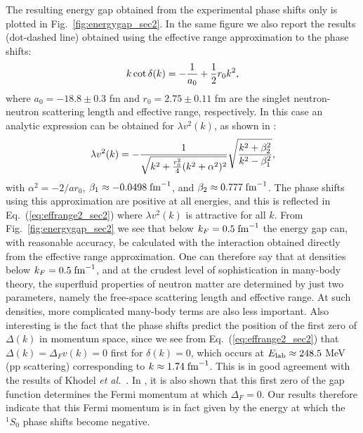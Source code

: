 \documentclass[rmp,aps,floatfix]{revtex4}
\begin{document}
The resulting energy gap obtained from the experimental phase
shifts only is plotted in Fig.~\ref{fig:energygap_sec2}.
In the same figure we also report the results (dot-dashed line) 
obtained using the effective range approximation to the phase shifts: 
\begin{equation}
       k\cot \delta(k)=-{{1}\over{a_0}}+{{1}\over{2}}r_0 k^2, 
\end{equation}
where $a_0=-18.8\pm 0.3$ fm and $r_0=2.75\pm 0.11$ fm are the singlet 
neutron-neutron scattering length and effective range, respectively.  
In this case an analytic expression can be obtained for $\lambda v^2(k)$, as 
shown in \cite{cs92}:
\begin{equation}
  \lambda v^2(k)=-{{1}\over{\sqrt{k^2+{{r_0^2}\over{4}}(k^2+\alpha^2)^2}}}
                \sqrt{{k^2+\beta_2^2}\over{k^2-\beta_1^2}},
   \label{eq:effrange2_sec2}
\end{equation}
with $\alpha^2=-2/ar_0$, $\beta_1\approx-0.0498\;{\rm fm}^{-1}$, 
and $\beta_2\approx 0.777\;{\rm fm}^{-1}$.  
The phase shifts using this approximation are positive at all energies, 
and this is reflected in Eq.~(\ref{eq:effrange2_sec2})  
where $\lambda v^2(k)$ 
is attractive for all $k$.  From Fig.~\ref{fig:energygap_sec2} we see that 
below $k_F=0.5\;{\rm fm}^{-1}$ the energy gap can, with reasonable 
accuracy, be calculated with the interaction obtained directly from 
the effective range approximation.  
One can therefore say that 
at densities below $k_F=0.5\;{\rm fm}^{-1}$, and at the crudest level 
of sophistication in many-body theory,  the superfluid properties 
of neutron matter are determined by just two parameters, namely 
the free-space scattering length and effective range. At such densities,
more complicated many-body terms are also less important.
Also interesting is the fact that the phase shifts predict the position 
of the first zero of $\Delta(k)$ in momentum space, since we see from 
Eq.~(\ref{eq:effrange2_sec2}) 
that $\Delta(k)=\Delta_F v(k)=0$ first for $\delta(k)=0$, 
which occurs at $E_{\rm lab}\approx 248.5$ MeV (pp scattering) 
corresponding to $k\approx 1.74\;{\rm fm}^{-1}$.  
This is in good agreement with the results of 
Khodel {\em et al.}~\cite{kkc96}.  In \cite{kkc96}, it is 
also shown that this first zero of the gap function determines the 
Fermi momentum at which $\Delta_F=0$.  Our results therefore indicate 
that this Fermi momentum is in fact given by the energy at which 
the $^1S_0$ phase shifts become negative. 
\end{document}
